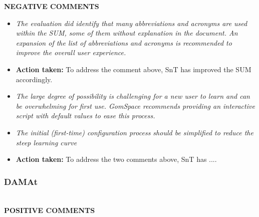 \textbf{NEGATIVE COMMENTS}

\begin{itemize}
\item \emph{The evaluation did identify that many abbreviations and acronyms are used within the SUM, some of them without explanation in the document. An expansion of the list of abbreviations and acronyms is recommended to improve the overall user experience.}

\item \textbf{Action taken:} To address the comment above, SnT has improved the SUM accordingly.

\item \emph{The large degree of possibility is challenging for a new user to learn and can be overwhelming for first use. GomSpace recommends providing an interactive script with default values to ease this process.}

\item \emph{The initial (first-time) configuration process should be simplified to reduce the steep learning curve}

\item \textbf{Action taken:} To address the two comments above, SnT has ....

\end{itemize}

\subsubsection{DAMAt} \ \\



\textbf{POSITIVE COMMENTS}

